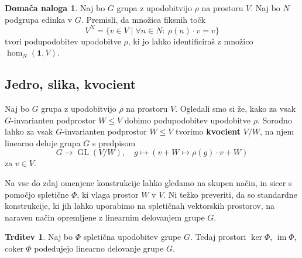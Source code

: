\documentclass[11pt]{book}
\def\oneone{\mathbf{1}}
\DeclareMathOperator\image{im}
\DeclareMathOperator\GL{GL}
\def\definicija{\color{rdeca}\bf}
\theoremstyle{definition}
\theoremstyle{zgled}
\theoremstyle{zgledbrezstevilke}
\theoremstyle{odprtproblem}
\theoremstyle{domacanaloga}
\newtheorem{domacanaloga}[theorem]{Domača naloga}
\theoremstyle{izrek}
\newtheorem{trditev}[theorem]{Trditev}
\begin{document}
\begin{domacanaloga}
    Naj bo $G$ grupa z upodobitvijo $\rho$ na prostoru $V$. Naj bo $N$ podgrupa edinka v $G$. Premisli, da množica fiksnih točk
    \[
        V^N = \{ v \in V \mid \forall n \in N \colon \ \rho(n) \cdot v = v \}
    \]
    tvori podupodobitev upodobitve $\rho$, ki jo lahko identificiraš z množico $\hom_N(\oneone, V)$. 
\end{domacanaloga}

\subsection{Jedro, slika, kvocient}

Naj bo $G$ grupa z upodobitvijo $\rho$ na prostoru $V$. Ogledali smo si že, kako za vsak $G$-invarianten podprostor $W \leq V$ dobimo podupodobitev upodobitve $\rho$. Sorodno lahko za vsak $G$-invarianten podprostor $W \leq V$ tvorimo {\definicija kvocient} $V/W$, na njem linearno deluje grupa $G$ s predpisom
\[
    G \to \GL(V/W), \quad
    g \mapsto \left( v + W \mapsto \rho(g) \cdot v + W \right)
\]
za $v \in V$.

Na vse do zdaj omenjene konstrukcije lahko gledamo na skupen način, in sicer s pomočjo spletične $\Phi$, ki vlaga prostor $W$ v $V$. Ni težko preveriti, da so standardne konstrukcije, ki jih lahko uporabimo na spletičnah vektorskih prostorov, na naraven način opremljene z linearnim delovanjem grupe $G$.

\begin{trditev}
Naj bo $\Phi$ spletična upodobitev grupe $G$. Tedaj prostori $\ker \Phi$, $\image \Phi$, $\mathrm{coker} \; \Phi$ podedujejo linearno delovanje grupe $G$.
\end{trditev}
\end{document}
